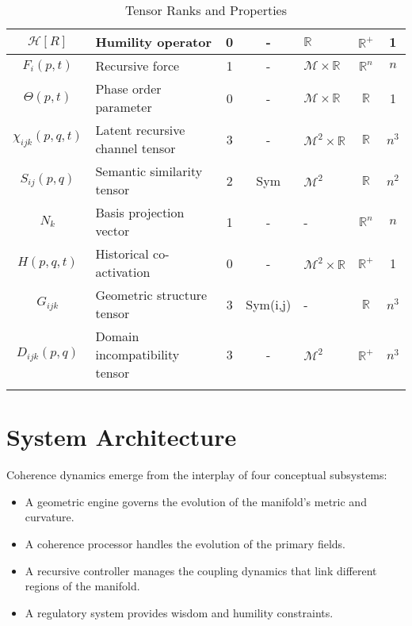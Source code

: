 {\begin{longtable}{|c|p{5.5cm}|c|c|p{1.5cm}|c|c|}
\hline
\(\mathcal{H}[R]\) & Humility operator & 0 & - & \(\mathbb{R}\) & \(\mathbb{R}^+\) & 1 \\
\hline
\(F_i(p,t)\) & Recursive force & 1 & - & \(\mathcal{M} \times \mathbb{R}\) & \(\mathbb{R}^n\) & \(n\) \\
\hline
\(\Theta(p,t)\) & Phase order parameter & 0 & - & \(\mathcal{M} \times \mathbb{R}\) & \(\mathbb{R}\) & 1 \\
\hline
\(\chi_{ijk}(p,q,t)\) & Latent recursive channel tensor & 3 & - & \(\mathcal{M}^2 \times \mathbb{R}\) & \(\mathbb{R}\) & \(n^3\) \\
\hline
\(S_{ij}(p,q)\) & Semantic similarity tensor\footnotemark[2] & 2 & Sym & \(\mathcal{M}^2\) & \(\mathbb{R}\) & \(n^2\) \\
\hline
\(N_k\) & Basis projection vector & 1 & - & - & \(\mathbb{R}^n\) & \(n\) \\
\hline
\(H(p,q,t)\) & Historical co-activation\footnotemark[3] & 0 & - & \(\mathcal{M}^2 \times \mathbb{R}\) & \(\mathbb{R}^+\) & 1 \\
\hline
\(G_{ijk}\) & Geometric structure tensor & 3 & Sym(i,j) & - & \(\mathbb{R}\) & \(n^3\) \\
\hline
\(D_{ijk}(p,q)\) & Domain incompatibility tensor & 3 & - & \(\mathcal{M}^2\) & \(\mathbb{R}^+\) & \(n^3\) \\
\hline
\caption{Tensor Ranks and Properties}
\end{longtable}
}

\section{System Architecture}\label{sec:system_architecture}

Coherence dynamics emerge from the interplay of four conceptual subsystems:
\begin{itemize}
    \item A geometric engine governs the evolution of the manifold's metric and curvature.
    \item A coherence processor handles the evolution of the primary fields.
    \item A recursive controller manages the coupling dynamics that link different regions of the manifold.
    \item A regulatory system provides wisdom and humility constraints.
\end{itemize}

